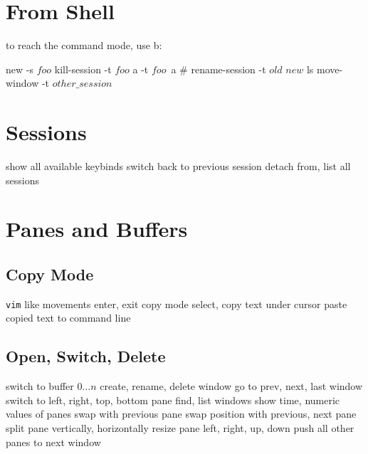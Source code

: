 
\def\content{\uppercase{tmux}}
\def\shortcontent{\content}
\def\versionnumber{1.3}  %
\def\version{v\versionnumber\ \month\ \year}


\mytitle

\shortintro
\shortintroTmux

\section{From Shell}{to reach the command mode, use \ctrl b:}

	{new -s {\tt $foo$}}
	{kill-session -t {\tt $foo$}}
	{a -t {\tt $foo$}\or\ a \#}
	{rename-session -t $old$ $new$}
	{ls}
	{move-window -t $other\_session$}

\section{Sessions}{\metakeydef}
	{show all available keybinds}
	{switch back to previous session}
	{detach from,  list all sessions}

\section{Panes and Buffers}{}
\subsection{Copy Mode}{{\tt vim} like movements}
	{enter, exit copy mode}
	{select,  copy text under cursor}
	{paste copied text to command line}

\subsection{Open, Switch, Delete}{}
	{switch to buffer $0 \ldots n$}
	{create, rename, delete window}
	{go to prev, next, last window}
	{switch to left, right, top, bottom pane}
	{find, list windows}
	{show time, numeric values of panes}
	{swap with previous pane}
	{swap position with previous, next pane}
	{split pane vertically, horizontally}
	{resize pane left, right, up, down}
	{push all other panes to next window}


